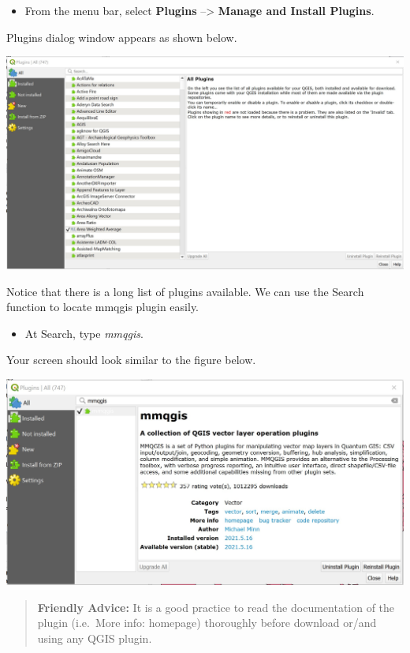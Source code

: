 \documentclass[
  letterpaper,
  DIV=11,
  numbers=noendperiod]{scrreprt}
\providecommand{\tightlist}{%
  \setlength{\itemsep}{0pt}\setlength{\parskip}{0pt}}\usepackage{longtable,booktabs,array}
\begin{document}
\begin{itemize}
\tightlist
\item
  From the menu bar, select \textbf{Plugins} --\textgreater{}
  \textbf{Manage and Install Plugins}.
\end{itemize}

Plugins dialog window appears as shown below.

\includegraphics{./img02/image18.jpg}

Notice that there is a long list of plugins available. We can use the
Search function to locate mmqgis plugin easily.

\begin{itemize}
\tightlist
\item
  At Search, type \emph{mmqgis}.
\end{itemize}

Your screen should look similar to the figure below.

\includegraphics{./img02/image19.jpg}

\begin{quote}
\textbf{Friendly Advice:} It is a good practice to read the
documentation of the plugin (i.e.~More info: homepage) thoroughly before
download or/and using any QGIS plugin.
\end{quote}
\end{document}
